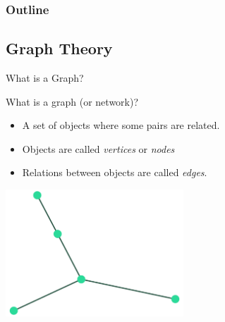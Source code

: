 \documentclass[unknownkeysallowed]{beamer}
\begin{document}
\begin{frame}
  \frametitle{Outline}
  \tableofcontents[currentsection]
\end{frame}

\subsection{Graph Theory}

\begin{frame}{What is a Graph?}

What is a graph (or network)?

  \begin{itemize}
    \pause
  \item A set of objects where some pairs are related.
    \pause
  \item Objects are called {\it vertices} or {\it nodes}
    \pause
  \item Relations between objects are called {\it edges}. 
  \end{itemize}
  \pause
  \centering
  \includegraphics[width=0.5\textwidth]{assets/mini-tree}

\end{frame}
\end{document}
